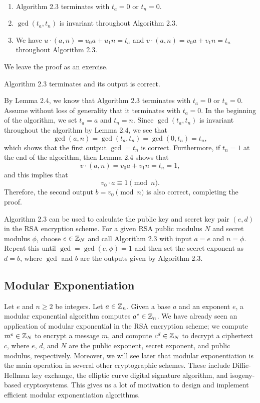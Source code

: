 \newpage
\begin{lemma}~
\begin{enumerate}[(1)]
    \item Algorithm 2.3 terminates with $t_a = 0$ or $t_n = 0$. 
    \item $\gcd(t_a, t_n)$ is invariant throughout Algorithm 2.3.
    \item We have $u \cdot (a, n) = u_0a + u_1n = t_a$ and $v \cdot (a, n) = v_0a + v_1n = t_n$
    throughout Algorithm 2.3. 
\end{enumerate}
\end{lemma}
\begin{pf}
We leave the proof as an exercise. 
\end{pf}

\begin{thm}
Algorithm 2.3 terminates and its output is correct.
\end{thm}
\begin{pf}
By Lemma 2.4, we know that Algorithm 2.3 terminates with $t_a = 0$ or $t_n = 0$. Assume without 
loss of generality that it terminates with $t_a = 0$. In the beginning of the algorithm,
we set $t_a = a$ and $t_n = n$. Since $\gcd(t_a, t_n)$ is invariant throughout the algorithm by 
Lemma 2.4, we see that 
\[ \gcd(a, n) = \gcd(t_a, t_n) = \gcd(0, t_n) = t_n, \]
which shows that the first output $\gcd = t_n$ is correct. Furthermore, if $t_n = 1$ at the 
end of the algorithm, then Lemma 2.4 shows that 
\[ v \cdot (a, n) = v_0a + v_1n = t_n = 1, \]
and this implies that
\[ v_0 \cdot a \equiv 1 \pmod n. \]
Therefore, the second output $b = v_0 \pmod n$ is also correct, completing the proof.
\end{pf}

Algorithm 2.3 can be used to calculate the public key and secret key pair $(e, d)$ in the RSA 
encryption scheme. For a given RSA public modulus $N$ and secret modulus $\phi$, choose 
$e \in \mathbb{Z}_N$ and call Algorithm 2.3 with input $a = e$ and $n = \phi$. Repeat this until 
$\gcd = \gcd(e, \phi) = 1$ and then set the secret exponent as $d = b$, where $\gcd$ and $b$ are the 
outputs given by Algorithm 2.3. 

\subsection{Modular Exponentiation}
Let $e$ and $n\geq 2$ be integers. Let $a \in \mathbb{Z}_n$. Given a base $a$ and an exponent $e$, 
a modular exponential algorithm computes $a^e \in \mathbb{Z}_n$. We have already seen an application of modular
exponential in the RSA encryption scheme; we compute $m^e \in \mathbb{Z}_N$ to encrypt a message $m$, 
and compute $c^d \in \mathbb{Z}_N$ to decrypt a ciphertext $c$, where $e$, $d$, and $N$ are the public 
exponent, secret exponent, and public modulus, respectively. Moreover, we will see later 
that modular exponentiation is the main operation in several other cryptographic schemes. 
These include Diffie-Hellman key exchange, the elliptic curve digital signature algorithm, 
and isogeny-based cryptosystems. This gives us a lot of motivation to design and implement 
efficient modular exponentiation algorithms. 

